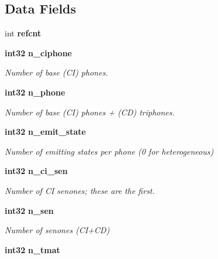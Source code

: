 \subsection*{\-Data \-Fields}
\begin{DoxyCompactItemize}
\item 
int {\bfseries refcnt}\label{structbin__mdef__s_a35282c2ff4e75fd87186e38dbf14e7f1}

\item 
{\bf int32} {\bf n\-\_\-ciphone}\label{structbin__mdef__s_a84d5f7acc6d85ba8c7611945f9c5e4e7}

\begin{DoxyCompactList}\small\item\em \-Number of base (\-C\-I) phones. \end{DoxyCompactList}\item 
{\bf int32} {\bf n\-\_\-phone}\label{structbin__mdef__s_ad746dbb3f8108f575a95182f96b4b18f}

\begin{DoxyCompactList}\small\item\em \-Number of base (\-C\-I) phones + (\-C\-D) triphones. \end{DoxyCompactList}\item 
{\bf int32} {\bf n\-\_\-emit\-\_\-state}\label{structbin__mdef__s_a2ad87254182be424ac6ff1234274f134}

\begin{DoxyCompactList}\small\item\em \-Number of emitting states per phone (0 for heterogeneous) \end{DoxyCompactList}\item 
{\bf int32} {\bf n\-\_\-ci\-\_\-sen}\label{structbin__mdef__s_ad7c318d6db85fd4b8ac13a81c145bbb8}

\begin{DoxyCompactList}\small\item\em \-Number of \-C\-I senones; these are the first. \end{DoxyCompactList}\item 
{\bf int32} {\bf n\-\_\-sen}\label{structbin__mdef__s_a3d1c202165d8e5e153a73d708ca28109}

\begin{DoxyCompactList}\small\item\em \-Number of senones (\-C\-I+\-C\-D) \end{DoxyCompactList}\item 
{\bf int32} {\bf n\-\_\-tmat}\label{structbin__mdef__s_a979557ad4f8369e84d93f633512345ca}


\end{DoxyCompactItemize}

